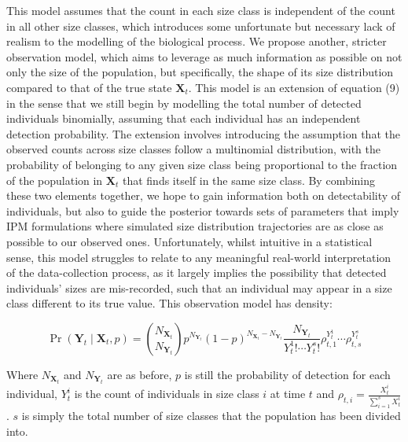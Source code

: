 \documentclass[a4paper,12pt]{article}
\begin{document}
This model assumes that the count in each size class is independent of the count in all other size classes, which introduces some unfortunate but necessary lack of realism to the modelling of the biological process. We propose another, stricter observation model, which aims to leverage as much information as possible on not only the size of the population, but specifically, the shape of its size distribution compared to that of the true state $\boldsymbol{X}_t$. This model is an extension of equation (9) in the sense that we still begin by modelling the total number of detected individuals binomially, assuming that each individual has an independent detection probability. The extension involves introducing the assumption that the observed counts across size classes follow a multinomial distribution, with the probability of belonging to any given size class being proportional to the fraction of the population in $\boldsymbol{X}_t$ that finds itself in the same size class. By combining these two elements together, we hope to gain information both on detectability of individuals, but also to guide the posterior towards sets of parameters that imply IPM formulations where simulated size distribution trajectories are as close as possible to our observed ones. Unfortunately, whilst intuitive in a statistical sense, this model struggles to relate to any meaningful real-world interpretation of the data-collection process, as it largely implies the possibility that detected individuals' sizes are mis-recorded, such that an individual may appear in a size class different to its true value. This observation model has density:

\begin{equation}
    \Pr\left(\boldsymbol{Y}_t\mid\boldsymbol{X}_t, p\right) =  {N_{\boldsymbol{X}_t} \choose N_{\boldsymbol{Y}_t}} p^{N_{\boldsymbol{Y}_t}}(1-p)^{N_{\boldsymbol{X}_t} - N_{\boldsymbol{Y}_t}}\frac{N_{\boldsymbol{Y}_t}}{Y_t^1!\cdots Y_t^s!}\rho_{t, 1}^{Y_t^1}\cdots\rho_{t, s}^{Y_t^s}
\end{equation}

Where $N_{\boldsymbol{X}_t}$ and $N_{\boldsymbol{Y}_t}$ are as before, $p$ is still the probability of detection for each individual, $Y_t^i$ is the count of individuals in size class $i$ at time $t$ and $\rho_{t, i} = \frac{X_t^i}{\sum_{i=1}^s X_t^i}$. $s$ is simply the total number of size classes that the population has been divided into. \\
\end{document}

